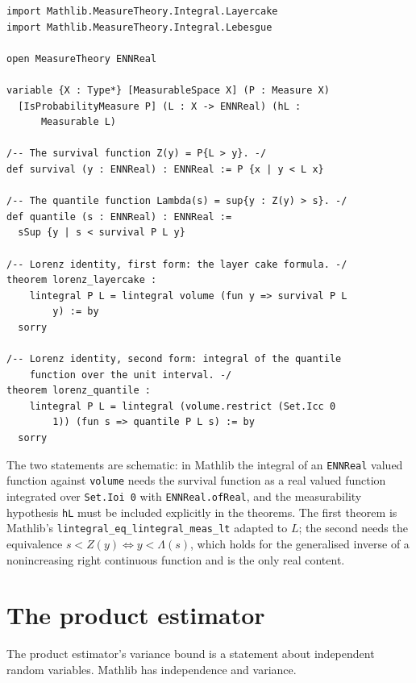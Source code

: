 \begin{footnotesize}
\begin{verbatim}
import Mathlib.MeasureTheory.Integral.Layercake
import Mathlib.MeasureTheory.Integral.Lebesgue

open MeasureTheory ENNReal

variable {X : Type*} [MeasurableSpace X] (P : Measure X)
  [IsProbabilityMeasure P] (L : X -> ENNReal) (hL :
      Measurable L)

/-- The survival function Z(y) = P{L > y}. -/
def survival (y : ENNReal) : ENNReal := P {x | y < L x}

/-- The quantile function Lambda(s) = sup{y : Z(y) > s}. -/
def quantile (s : ENNReal) : ENNReal :=
  sSup {y | s < survival P L y}

/-- Lorenz identity, first form: the layer cake formula. -/
theorem lorenz_layercake :
    lintegral P L = lintegral volume (fun y => survival P L
        y) := by
  sorry

/-- Lorenz identity, second form: integral of the quantile
    function over the unit interval. -/
theorem lorenz_quantile :
    lintegral P L = lintegral (volume.restrict (Set.Icc 0
        1)) (fun s => quantile P L s) := by
  sorry
\end{verbatim}
\end{footnotesize}

The two statements are schematic: in Mathlib the integral of an \texttt{ENNReal} valued function against \texttt{volume} needs the survival function as a real valued function integrated over \texttt{Set.Ioi 0} with \texttt{ENNReal.ofReal}, and the measurability hypothesis \texttt{hL} must be included explicitly in the theorems. The first theorem is Mathlib's \texttt{lintegral\_eq\_lintegral\_meas\_lt} adapted to $L$; the second needs the equivalence $s < Z(y) \iff y < \Lambda(s)$, which holds for the generalised inverse of a nonincreasing right continuous function and is the only real content.

\section{The product estimator}

The product estimator's variance bound is a statement about independent random variables. Mathlib has independence and variance.

